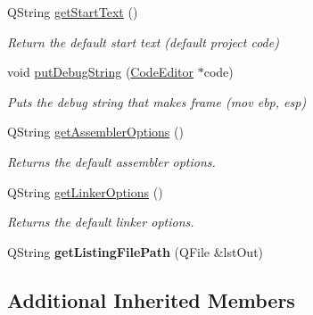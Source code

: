 \begin{DoxyCompactItemize}
\item 
\hypertarget{class_f_a_s_m_acc88d6cc29358917f095925d91d831cf}{}Q\+String \hyperlink{class_f_a_s_m_acc88d6cc29358917f095925d91d831cf}{get\+Start\+Text} ()\label{class_f_a_s_m_acc88d6cc29358917f095925d91d831cf}

\begin{DoxyCompactList}\small\item\em Return the default start text (default project code) \end{DoxyCompactList}\item 
\hypertarget{class_f_a_s_m_a1e912edf8fb4e1d229c4f96089a75118}{}void \hyperlink{class_f_a_s_m_a1e912edf8fb4e1d229c4f96089a75118}{put\+Debug\+String} (\hyperlink{class_code_editor}{Code\+Editor} $\ast$code)\label{class_f_a_s_m_a1e912edf8fb4e1d229c4f96089a75118}

\begin{DoxyCompactList}\small\item\em Puts the debug string that makes frame (mov ebp, esp) \end{DoxyCompactList}\item 
\hypertarget{class_f_a_s_m_aa5c0613929b1ef1feaadb37e199375a5}{}Q\+String \hyperlink{class_f_a_s_m_aa5c0613929b1ef1feaadb37e199375a5}{get\+Assembler\+Options} ()\label{class_f_a_s_m_aa5c0613929b1ef1feaadb37e199375a5}

\begin{DoxyCompactList}\small\item\em Returns the default assembler options. \end{DoxyCompactList}\item 
\hypertarget{class_f_a_s_m_a8739150ad8abe0f9467c406e2d7f999f}{}Q\+String \hyperlink{class_f_a_s_m_a8739150ad8abe0f9467c406e2d7f999f}{get\+Linker\+Options} ()\label{class_f_a_s_m_a8739150ad8abe0f9467c406e2d7f999f}

\begin{DoxyCompactList}\small\item\em Returns the default linker options. \end{DoxyCompactList}\item 
\hypertarget{class_f_a_s_m_aa6c068b5c4cda6b6d67f199fed86fa57}{}Q\+String {\bfseries get\+Listing\+File\+Path} (Q\+File \&lst\+Out)\label{class_f_a_s_m_aa6c068b5c4cda6b6d67f199fed86fa57}

\end{DoxyCompactItemize}
\subsection*{Additional Inherited Members}


